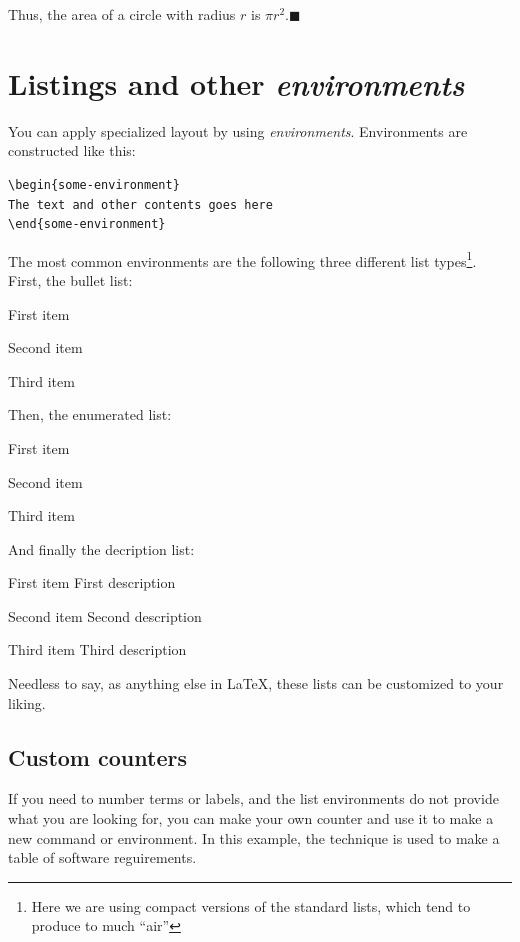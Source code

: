 Thus, the area of a circle with radius $r$ is $\pi r^2$.\hfill$\blacksquare$

\section{Listings and other {\em environments}}

You can apply specialized layout by using  {\em environments}. Environments are constructed like this:

\begin{lstlisting}[float=htpb]
\begin{some-environment}
The text and other contents goes here
\end{some-environment}
\end{lstlisting}

The most common environments are the following three different list types\footnote{Here we are using compact versions of the standard lists, which tend to produce to much ``air''}. First, the bullet list:

\begin{compactitem}
\item First item
\item Second item
\item Third item
\end{compactitem}
Then, the enumerated list:
\begin{compactenum}
\item First item
\item Second item
\item Third item
\end{compactenum}
And finally the decription list:
\begin{compactdesc}
\item [First item] First description \lipsum[5]
\item [Second item] Second description
\item [Third item] Third description
\end{compactdesc}

Needless to say, as anything else in \LaTeX, these lists can be customized to your liking.

\subsection{Custom counters}

If you need to number terms or labels, and the list environments do not provide what you are looking for, you can make your own counter and use it to make a new command or environment. In this example, the technique is used to make a table of software reguirements. 

